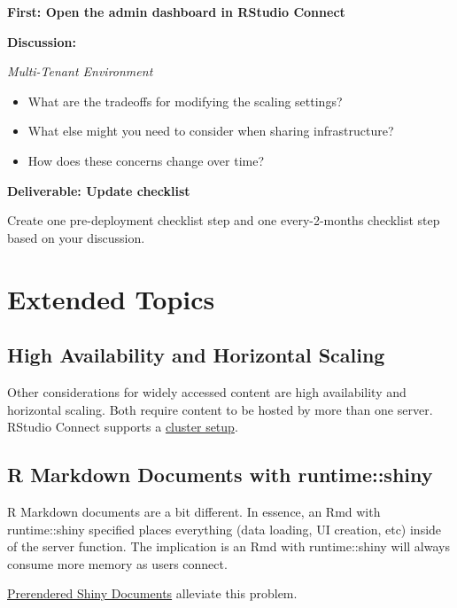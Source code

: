 \documentclass[]{book}
\providecommand{\tightlist}{%
  \setlength{\itemsep}{0pt}\setlength{\parskip}{0pt}}
\theoremstyle{definition}
\theoremstyle{definition}
\theoremstyle{definition}
\theoremstyle{remark}
\begin{document}
\textbf{First: Open the admin dashboard in RStudio Connect}

\textbf{Discussion:}

\emph{Multi-Tenant Environment}

\begin{itemize}
\tightlist
\item
  What are the tradeoffs for modifying the scaling settings?
\item
  What else might you need to consider when sharing infrastructure?
\item
  How does these concerns change over time?
\end{itemize}

\textbf{Deliverable: Update checklist}

Create one pre-deployment checklist step and one every-2-months
checklist step based on your discussion.

\hypertarget{extended-topics-1}{%
\section{Extended Topics}\label{extended-topics-1}}

\hypertarget{high-availability-and-horizontal-scaling}{%
\subsection{High Availability and Horizontal
Scaling}\label{high-availability-and-horizontal-scaling}}

Other considerations for widely accessed content are high availability
and horizontal scaling. Both require content to be hosted by more than
one server. RStudio Connect supports a
\href{https://docs.rstudio.com/connect/admin/high-availability.html}{cluster
setup}.

\hypertarget{r-markdown-documents-with-runtimeshiny}{%
\subsection{R Markdown Documents with
runtime::shiny}\label{r-markdown-documents-with-runtimeshiny}}

R Markdown documents are a bit different. In essence, an Rmd with
runtime::shiny specified places everything (data loading, UI creation,
etc) inside of the server function. The implication is an Rmd with
runtime::shiny will always consume more memory as users connect.

\href{https://rmarkdown.rstudio.com/authoring_shiny_prerendered.html}{Prerendered
Shiny Documents} alleviate this problem.
\end{document}
